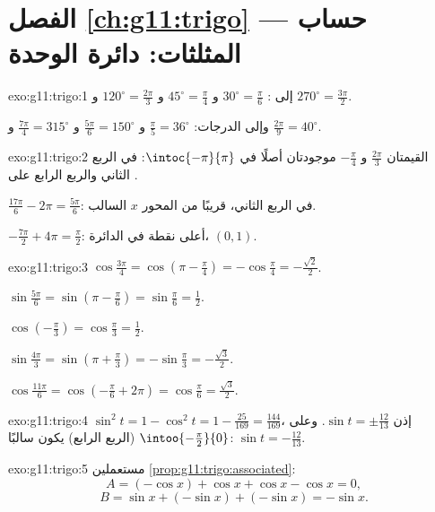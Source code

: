 \section*{الفصل \ref{ch:g11:trigo} --- حساب المثلثات: دائرة الوحدة}

\begin{solution}{exo:g11:trigo:1}
إلى : $30^\circ = \frac{\pi}{6}$ و $45^\circ = \frac{\pi}{4}$ و
$120^\circ = \frac{2\pi}{3}$ و $270^\circ = \frac{3\pi}{2}$.

وإلى الدرجات: $\frac{\pi}{5} = 36^\circ$ و $\frac{5\pi}{6} = 150^\circ$ و
$\frac{7\pi}{4} = 315^\circ$ و $\frac{2\pi}{9} = 40^\circ$.
\end{solution}

\begin{solution}{exo:g11:trigo:2}
القيمتان $\frac{2\pi}{3}$ و $-\frac{\pi}{4}$ موجودتان أصلًا في
$\intoc{-\pi}{\pi}$: في الربع الثاني والربع الرابع على .

$\frac{17\pi}{6} - 2\pi = \frac{5\pi}{6}$: في الربع الثاني، قريبًا من
المحور $x$ السالب.

$-\frac{7\pi}{2} + 4\pi = \frac{\pi}{2}$: أعلى نقطة في الدائرة،
$(0, 1)$.
\end{solution}

\begin{solution}{exo:g11:trigo:3}
$\cos\frac{3\pi}{4} = \cos\left(\pi - \frac\pi4\right)
= -\cos\frac\pi4 = -\frac{\sqrt2}{2}$.

$\sin\frac{5\pi}{6} = \sin\left(\pi - \frac\pi6\right)
= \sin\frac\pi6 = \frac12$.

$\cos\left(-\frac\pi3\right) = \cos\frac\pi3 = \frac12$.

$\sin\frac{4\pi}{3} = \sin\left(\pi + \frac\pi3\right)
= -\sin\frac\pi3 = -\frac{\sqrt3}{2}$.

$\cos\frac{11\pi}{6} = \cos\left(-\frac\pi6 + 2\pi\right)
= \cos\frac\pi6 = \frac{\sqrt3}{2}$.
\end{solution}

\begin{solution}{exo:g11:trigo:4}
$\sin^2 t = 1 - \cos^2 t = 1 - \frac{25}{169} = \frac{144}{169}$، إذن
$\sin t = \pm\frac{12}{13}$. وعلى $\intoo{-\frac\pi2}{0}$ (الربع الرابع)
يكون  سالبًا: $\sin t = -\frac{12}{13}$.
\end{solution}

\begin{solution}{exo:g11:trigo:5}
مستعملين \cref{prop:g11:trigo:associated}:
\[
A = (-\cos x) + \cos x + \cos x - \cos x = 0 ,
\]
\[
B = \sin x + (-\sin x) + (-\sin x) = -\sin x .
\]
\end{solution}

